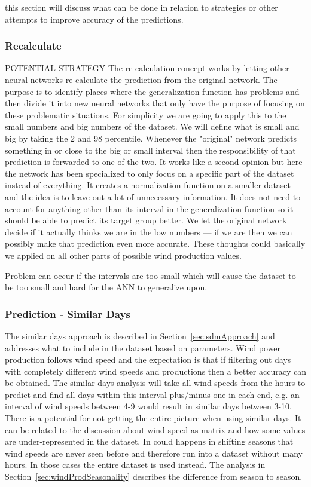 this section will discuss what can be done in relation to strategies or other attempts to improve accuracy of the predictions.

\subsubsection{Recalculate}
POTENTIAL STRATEGY
The re-calculation concept works by letting other neural networks re-calculate the prediction from the original network. The purpose is to identify places where the generalization function has problems and then divide it into new neural networks that only have the purpose of focusing on these problematic situations. For simplicity we are going to apply this to the small numbers and big numbers of the dataset. We will define what is small and big by taking the 2 and 98 percentile. Whenever the "original" network predicts something in or close to the big or small interval then the responsibility of that prediction is forwarded to one of the two. It works like a second opinion but here the network has been specialized to only focus on a specific part of the dataset instead of everything. It creates a normalization function on a smaller dataset and the idea is to leave out a lot of unnecessary information. It does not need to account for anything other than its interval in the generalization function so it should be able to predict its target group better. We let the original network decide if it actually thinks we are in the low numbers --- if we are then we can possibly make that prediction even more accurate. These thoughts could basically we applied on all other parts of possible wind production values. 

Problem can occur if the intervals are too small which will cause the dataset to be too small and hard for the ANN to generalize upon.

\subsubsection{Prediction - Similar Days}
The similar days approach is described in Section~\ref{sec:sdmApproach} and addresses what to include in the dataset based on parameters. Wind power production follows wind speed and the expectation is that if filtering out days with completely different wind speeds and productions then a better accuracy can be obtained. The similar days analysis will take all wind speeds from the hours to predict and find all days within this interval plus/minus one in each end, e.g. an interval of wind speeds between 4-9 would result in similar days between 3-10. There is a potential for not getting the entire picture when using similar days. It can be related to the discussion about wind speed as matrix and how some values are under-represented in the dataset. In could happens in shifting seasons that wind speeds are never seen before and therefore run into a dataset without many hours. In those cases the entire dataset is used instead. The analysis in Section~\ref{sec:windProdSeasonality} describes the difference from season to season.

